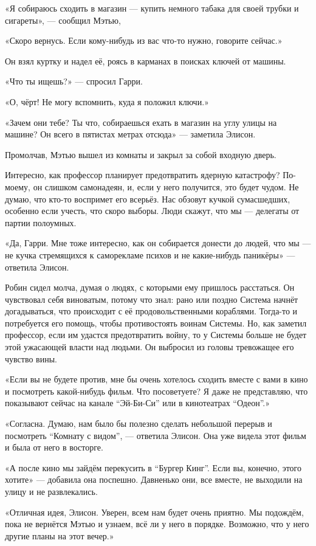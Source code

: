 \documentclass[a5paper, 9pt,
final, openany, twoside=true]{memoir}
\begin{document}
«Я собираюсь сходить в магазин — купить немного табака для своей трубки и сигареты», — сообщил Мэтью,

«Скоро вернусь. Если кому-нибудь из вас что-то нужно, говорите сейчас.»

Он взял куртку и надел её, роясь в карманах в поисках ключей от машины.

«Что ты ищешь?» — спросил Гарри.

«О, чёрт! Не могу вспомнить, куда я положил ключи.»

«Зачем они тебе? Ты что, собираешься ехать в магазин на углу улицы на машине? Он всего в пятистах метрах отсюда» — заметила Элисон.

Промолчав, Мэтью вышел из комнаты и закрыл за собой входную дверь.

Интересно, как профессор планирует предотвратить ядерную катастрофу? По-моему, он слишком самонадеян, и, если у него получится, это будет чудом. Не думаю, что кто-то воспримет его всерьёз. Нас обзовут кучкой сумасшедших, особенно если учесть, что скоро выборы. Люди скажут, что мы — делегаты от партии полоумных.

«Да, Гарри. Мне тоже интересно, как он собирается донести до людей, что мы — не кучка стремящихся к саморекламе психов и не какие-нибудь паникёры» — ответила Элисон.

Робин сидел молча, думая о людях, с которыми ему пришлось расстаться. Он чувствовал себя виноватым, потому что знал: рано или поздно Система начнёт догадываться, что происходит с её продовольственными кораблями. Тогда-то и потребуется его помощь, чтобы противостоять воинам Системы. Но, как заметил профессор, если им удастся предотвратить войну, то у Системы больше не будет этой ужасающей власти над людьми. Он выбросил из головы тревожащее его чувство вины.\bigskip

«Если вы не будете против, мне бы очень хотелось сходить вместе с вами в кино и посмотреть какой-нибудь фильм. Что посоветуете? Я даже не представляю, что показывают сейчас на канале ``Эй-Би-Си'' или в кинотеатрах ``Одеон''.»

«Согласна. Думаю, нам было бы полезно сделать небольшой перерыв и посмотреть ``Комнату с видом'', — ответила Элисон. Она уже видела этот фильм и была от него в восторге.

«А после кино мы зайдём перекусить в ``Бургер Кинг''. Если вы, конечно, этого хотите» — добавила она поспешно. Давненько они, все вместе, не выходили на улицу и не развлекались.

«Отличная идея, Элисон. Уверен, всем нам будет очень приятно. Мы подождём, пока не вернётся Мэтью и узнаем, всё ли у него в порядке. Возможно, что у него другие планы на этот вечер.»
\end{document}
